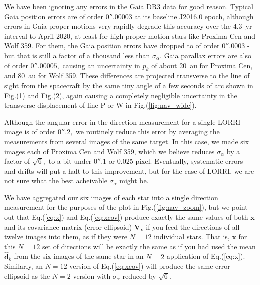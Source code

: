 \documentclass[]{aastex63}
\newcommand{\BV}[1]{\mathbf{#1}}
\newcommand{\BH}[1]{\hat{\mathbf{#1}}}
\begin{document}
We have been ignoring any errors in the Gaia DR3 data for good reason. Typical Gaia position errors are of order $0''\!\!.00003$ at its baseline J2016.0 epoch, although errors in Gaia proper motions very rapidly degrade this accuracy over the 4.3~yr interval to April 2020, at least for high proper motion stars like Proxima Cen and Wolf 359. For them, the Gaia position errors have dropped to of order $0''\!\!.0003$ - but that is still a factor of a thousand less than $\sigma_\alpha.$ Gaia parallax errors are also of order $0''\!\!.00005,$ causing an uncertainty in $p_k$ of about 20~au for Proxima Cen, and 80~au for Wolf 359.  These differences are projected transverse to the line of sight from the spacecraft by the same tiny angle of a few seconds of arc shown in Fig.(1) and Fig.(2), again causing a completely negligible uncertainty in the transverse displacement of line P or W in Fig.(\ref{fig:nav_wide}).

Although the angular error in the direction measurement for a single LORRI image is of order $0''\!\!.2,$ we routinely reduce this error by averaging the measurements from several images of the same target.  In this case, we made six images each of Proxima Cen and Wolf 359, which we believe reduces $\sigma_\alpha$ by a factor of $\sqrt{6},$ to a bit under $0''\!\!.1$ or 0.025 pixel.  Eventually, systematic errors and drifts will put a halt to this improvement, but for the case of LORRI, we are not sure what the best acheivable $\sigma_\alpha$ might be.

We have aggregated our six images of each star into a single direction measurement for the purposes of the plot in Fig.(\ref{fig:nav_zoom}), but we point out that Eq.(\ref{eq:x}) and Eq.(\ref{eq:xcov}) produce exactly the same values of both $\BV{x}$ and its covariance matrix (error ellipsoid) $\BV{V}_\BV{x}$ if you feed the directions of all twelve images into them, as if they were $N=12$ individual stars.  That is, $\BV{x}$ for this $N=12$ set of directions will be exactly the same as if you had used the mean $\BH{d}_k$ from the six images of the same star in an $N=2$ application of Eq.(\ref{eq:x}).  Similarly, an $N=12$ version of Eq.(\ref{eq:xcov}) will produce the same error ellipsoid as the $N=2$ version with $\sigma_\alpha$ reduced by $\sqrt{6}.$
\end{document}
